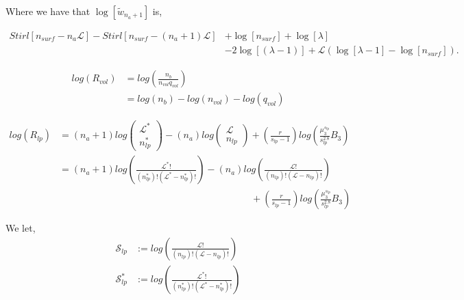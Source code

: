 \documentclass[12pt,letterpaper]{article}
\newcommand{\leng}{\mathcal{L}}
\newcommand{\lr}[1]{\left( #1 \right)}
\newcommand{\lrb}[1]{\left[ #1 \right]}
\newcommand{\schw}{\ensuremath{\mathscr{S}}}
\newcommand{\facto}[2]{
    \ensuremath{
        \frac{
        #1!
        }{
        \lr{
        #2
        }!
        \lr{
        #1
        -
        #2
        }!
        }
    }
}
\begin{document}
Where we have that 
$
\log
\lrb{
   \tilde{w}_{n_a+1} 
}
$
is,

\begin{align}
   Stirl
   \lrb{
        n_{surf}
        -
        n_a
        \leng
    }
    -
    Stirl
    \lrb{
            n_{surf}
            -
        (n_a+1)
        \leng
   }
   &+
   \log
   \lrb{
    n_{surf}
    }
    +
    \log
   \lrb{
        \lambda
   }\nonumber\\
   &
   -
   2
   \log
   \lrb{
        (\lambda-1)
   }
   +
   \leng
   \left(
    \log
    \lrb{
            \lambda
            -
            1
    }
    -
    \log
    \lrb{
            n_{surf}
        }
    \right)
    .
    \label{wk2logsupp}
\end{align}

\begin{align}
     log
     \lr{
        R_{vol}
    }
    &=
    log
    \lr{
    	\frac{
		    n_b
		}{
		    n_{vol} q_{vol}
		}
    }\\
    &=
    log
    \lr{
        n_b
    }
    -
    log
    \lr{
        n_{vol}
    }
    -
    log
    \lr{
        q_{vol}
    }    
\end{align}

\begin{align}
\label{eq.LogRvol1}
log
\lr{
    R_{lp}
}
&=
\lr{n_a+1}   
log
\lr{
    \begin{array}{c}
    \leng^{*}\\
    n_{lp}^{*} 
    \end{array}
}
-
\lr{n_a}
log
\lr{
\begin{array}{c}
     \leng\\
     n_{lp}
\end{array}
}
+
\lr{
    \frac{
        r
    }{
        s_{lp}-1
    }
}
log
\lr{
    \frac{
        \mu_3^{
            s_{lp}
        }
    }{
        s_{lp}^{2.8}
    }
    B_3
}
\nonumber\\
&=
\lr{n_a+1}   
log
\lr{
    \facto{
        \leng^{*}
    }{
        n_{lp}^{*}
    }
}
-
\lr{n_a}
log
\lr{
    \facto{
        \leng
    }{
        n_{lp}
    }
}
\\
&\qquad\qquad\qquad
\qquad\qquad\qquad
\qquad\qquad\qquad
\qquad
+
\lr{
    \frac{
        r
    }{
        s_{lp}-1
    }
}
log
\lr{
    \frac{
        \mu_3^{
            s_{lp}
        }
    }{
        s_{lp}^{2.8}
    }
    B_3
}\nonumber
\end{align}

We let, 
\begin{align}
\schw_{lp}
&:=
log
\lr{
\facto{
    \leng
}{
    n_{lp}
}
}\\
\schw^{*}_{lp}
&:=
log
\lr{
\facto{
    \leng^{*}
}{
    n_{lp}^{*}
}
}
\end{align}
\end{document}

